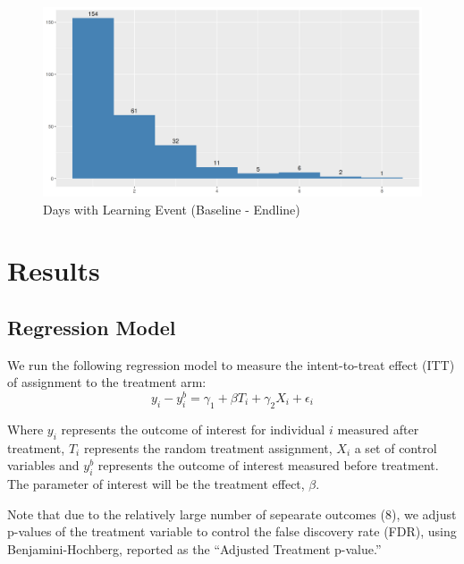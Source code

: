 \documentclass{article}
\begin{document}
\begin{figure}[H]
  \centering
\includegraphics[width=\textwidth]{plots/Treatment Takeup Baseline - Endline.png}
\caption{Days with Learning Event (Baseline - Endline)}
\label{fig:treatment-takeup-histogram}
\end{figure}









\section{Results}

\subsection*{Regression Model}

We run the following regression model to measure the intent-to-treat effect (ITT) of assignment to the treatment arm:
$$
y_{i} - y^{b}_i = \gamma_1 + \beta T_{i} + \gamma_2X_{i} + \epsilon_i
$$

Where $y_i$ represents the outcome of interest for individual $i$ measured after treatment, $T_i$ represents the random treatment assignment, $X_i$ a set of control variables and $y^b_i$ represents the outcome of interest measured before treatment. The parameter of interest will be the treatment effect, $\beta$.

Note that due to the relatively large number of sepearate outcomes (8), we adjust p-values of the treatment variable to control the false discovery rate (FDR), using Benjamini-Hochberg, reported as the ``Adjusted Treatment p-value.''
\end{document}
